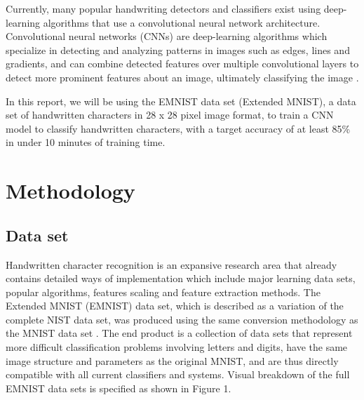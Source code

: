 \documentclass[conference]{IEEEtran}
\begin{document}
Currently, many popular handwriting detectors and classifiers exist using deep-learning algorithms that use a convolutional neural network architecture. Convolutional neural networks (CNNs) are deep-learning algorithms which specialize in detecting and analyzing patterns in images such as edges, lines and gradients, and can combine detected features over multiple convolutional layers to detect more prominent features about an image, ultimately classifying the image \cite{b1}. 

In this report, we will be using the EMNIST data set (Extended MNIST), a data set of handwritten characters in 28 x 28 pixel image format, to train a CNN model to classify handwritten characters, with a target accuracy of at least 85\% in under 10 minutes of training time.


\section{Methodology}

\subsection{Data set}

Handwritten character recognition is an expansive research area that already contains detailed ways of implementation which include major learning data sets, popular algorithms, features scaling and feature extraction methods. The Extended MNIST (EMNIST) data set, which is described as a variation of the complete NIST data set, was produced using the same conversion methodology as the MNIST data set \cite{b2}. The end product is a collection of data sets that represent more difficult classification problems involving letters and digits, have the same image structure and parameters as the original MNIST, and are thus directly compatible with all current classifiers and systems. Visual breakdown of the full EMNIST data sets is specified as shown in Figure 1. 
\end{document}
